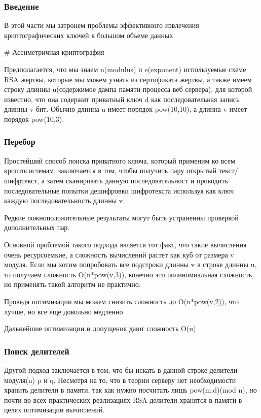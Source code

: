 \documentclass[20pt]{article}
\begin{document}
\subsubsection{Введение}
В этой части мы затронем проблемы эффективного извлечения криптографических
ключей в большом объеме данных.

\# Ассиметричная криптография

Предполагается, что мы знаем n(modulus) и e(exponent) используемые схеме RSA
жертвы, которые мы можем узнать из сертификата жертвы, а также имеем строку
длинны u(содержимое дампа памяти процесса веб сервера), для которой известно,
что она содержит приватный ключ d как последовательная запись длинны v бит.
Обычно длинна u имеет порядок pow(10,10), а длинна v имеет порядок pow(10,3).

\subsubsection{Перебор}

Простейший способ поиска приватного ключа, который применим ко всем
криптосистемам, заключается в том, чтобы получить пару открытый текст/шифртекст,
а затем сканировать данную последовательност и проводить последовательные попытки
дешифровки шифротекста используя как ключ каждую последовательность длинны v.

Редкие ложноположительные результаты могут быть устраненны проверкой
дополнительных пар.

Основной проблемой такого подхода является тот факт, что такие вычисления очень
ресурсоемкие, а сложность вычислений растет как куб от размера v модуля. Если мы
хотим попробовать все подстроки длинны v в строке длинны u, то получаем сложность
O(n*pow(v,3)), конечно это полиномиальная сложность, но применять такой алгоритм
не практично.

Проведя оптимизации мы можем снизить сложность до O(n*pow(v,2)), что лучше, но
все еще довольно медленно.

Дальнейшие оптимизации и допущения дают сложность O(u)

\subsubsection{Поиск делителей}

Другой подход заключается в том, что бы искать в данной строке делители модуля(n)
p и q. Несмотря на то, что в теории серверу нет необходимости хранить делители в
памяти, так как нужно посчитать лишь pow(m,d)(mod n), но почти во всех практических
реализациях RSA делители хранятся в памяти в целях оптимизации вычислений.
\end{document}
